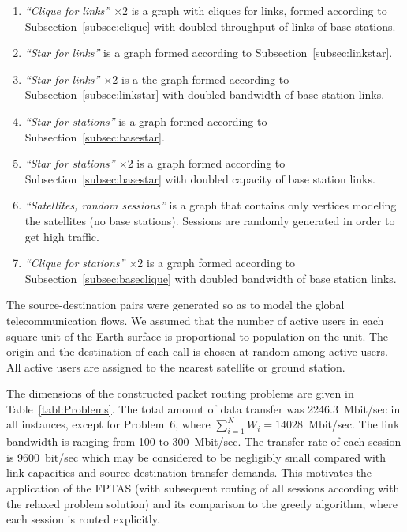 \documentclass{ifacconf}
\begin{document}
\begin{enumerate}
\item {\em ``Clique for links'' $\times 2$} is a graph with cliques for
links, formed according to Subsection~\ref{subsec:clique} with doubled
throughput of links of base stations.
 \item {\em ``Star for links''} is a graph formed according to
Subsection~\ref{subsec:linkstar}.
 \item {\em ``Star for links'' $\times
2$} is a the graph formed according to Subsection~\ref{subsec:linkstar} with
doubled bandwidth of base station links.
 \item {\em ``Star for stations''} is a graph formed according to
Subsection~\ref{subsec:basestar}.
\item {\em ``Star for stations'' $\times 2$} is a graph formed according to Subsection~\ref{subsec:basestar}
with doubled capacity of base station links.
 \item {\em ``Satellites, random sessions''} is a graph that contains only
vertices modeling the satellites (no base stations). Sessions are randomly generated
in order to get high traffic.
 \item {\em ``Clique for stations'' $\times 2$} is a graph formed according to Subsection~\ref{subsec:baseclique} with
doubled bandwidth of base station links.
\end{enumerate}

The source-destination pairs were generated so as
to model the global telecommunication flows. We assumed that the
number of active users in each square unit of the Earth surface is
proportional to population on the unit. The origin and the
destination of each call is chosen at random among active users.
All active users are assigned to the nearest satellite or ground
station.

The dimensions of the constructed packet routing problems are given in
Table~\ref{tabl:Problems}. 
The total amount of data transfer was 2246.3~Mbit/sec in all instances, except for Problem~6, where $\sum_{i=1}^N W_i=14028$~Mbit/sec.
The link bandwidth is ranging from 100 to 300~Mbit/sec.
The transfer rate of each session is 9600~bit/sec which may be considered to be negligibly small compared with link capacities and source-destination 
transfer demands. This motivates the application of the FPTAS (with subsequent routing of all sessions according with the relaxed problem solution) 
and its comparison to the greedy algorithm, where each session is routed explicitly. 
\end{document}
